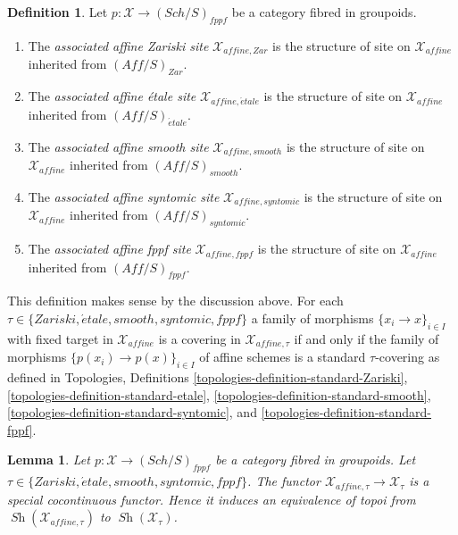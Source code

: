 \documentclass{stacks-project}
\theoremstyle{plain}
\newtheorem{lemma}[subsection]{Lemma}
\theoremstyle{definition}
\newtheorem{definition}[subsection]{Definition}
\theoremstyle{remark}
\numberwithin{equation}{subsection}
\def\Sch{\mathit{Sch}}
\def\Sh{\mathop{\mathit{Sh}}\nolimits}
\def\etale{{\acute{e}tale}}
\begin{document}
\begin{definition}
\label{definition-alternative-inherited-topologies}
Let $p : \mathcal{X} \to (\Sch/S)_{fppf}$ be a category fibred in groupoids.
\begin{enumerate}
\item The {\it associated affine Zariski site} $\mathcal{X}_{affine, Zar}$
is the structure of site on $\mathcal{X}_{affine}$ inherited from
$(\textit{Aff}/S)_{Zar}$.
\item The {\it associated affine \'etale site} $\mathcal{X}_{affine, \etale}$
is the structure of site on $\mathcal{X}_{affine}$ inherited from
$(\textit{Aff}/S)_\etale$.
\item The {\it associated affine smooth site}
$\mathcal{X}_{affine, smooth}$
is the structure of site on $\mathcal{X}_{affine}$ inherited from
$(\textit{Aff}/S)_{smooth}$.
\item The {\it associated affine syntomic site} $\mathcal{X}_{affine, syntomic}$
is the structure of site on $\mathcal{X}_{affine}$ inherited from
$(\textit{Aff}/S)_{syntomic}$.
\item The {\it associated affine fppf site} $\mathcal{X}_{affine, fppf}$
is the structure of site on $\mathcal{X}_{affine}$ inherited from
$(\textit{Aff}/S)_{fppf}$.
\end{enumerate}
\end{definition}

\noindent
This definition makes sense by the discussion above. For each
$\tau \in \{Zariski, \etale, smooth, syntomic, fppf\}$ a
family of morphisms $\{x_i \to x\}_{i \in I}$ with fixed target
in $\mathcal{X}_{affine}$ is a covering in $\mathcal{X}_{affine, \tau}$
if and only if the family of morphisms $\{p(x_i) \to p(x)\}_{i \in I}$
of affine schemes is a standard $\tau$-covering as defined in
Topologies, Definitions
\ref{topologies-definition-standard-Zariski},
\ref{topologies-definition-standard-etale},
\ref{topologies-definition-standard-smooth},
\ref{topologies-definition-standard-syntomic}, and
\ref{topologies-definition-standard-fppf}.

\begin{lemma}
\label{lemma-alternative}
Let $p : \mathcal{X} \to (\Sch/S)_{fppf}$ be a category fibred in groupoids.
Let $\tau \in \{Zariski, \etale, smooth, syntomic, fppf\}$. The functor
$\mathcal{X}_{affine, \tau} \to \mathcal{X}_\tau$ is a special
cocontinuous functor. Hence it induces an equivalence of topoi
from $\Sh(\mathcal{X}_{affine, \tau})$ to $\Sh(\mathcal{X}_\tau)$.
\end{lemma}
\end{document}
